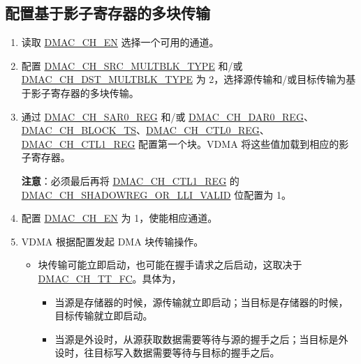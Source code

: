 \documentclass[main\_\_CN.tex]{subfiles}
\begin{document}
\subsection{配置基于影子寄存器的多块传输}
\begin{enumerate}
    \item 读取 \hyperref[fielddesc:DMACCH1EN]{DMAC\_CH\_EN} 选择一个可用的通道。

    \item 配置 \hyperref[fielddesc:DMACCHNSRCMULTBLKTYPE]{DMAC\_CH\_SRC\_MULTBLK\_TYPE} 和/或 \hyperref[fielddesc:DMACCHNDSTMULTBLKTYPE]{DMAC\_CH\_DST\_MULTBLK\_TYPE} 为 2，选择源传输和/或目标传输为基于影子寄存器的多块传输。

    \item 通过 \hyperref[regdesc:DMACCHNSAR0REG]{DMAC\_CH\_SAR0\_REG} 和/或 \hyperref[regdesc:DMACCHNDAR0REG]{DMAC\_CH\_DAR0\_REG}、\hyperref[fielddesc:DMACCHNBLOCKTS]{DMAC\_CH\_BLOCK\_TS}、\hyperref[regdesc:DMACCHNCTL0REG]{DMAC\_CH\_CTL0\_REG}、\hyperref[regdesc:DMACCHNCTL1REG]{DMAC\_CH\_CTL1\_REG} 配置第一个块。VDMA 将这些值加载到相应的影子寄存器。

    \textbf{注意}：必须最后再将 \hyperref[regdesc:DMACCHNCTL1REG]{DMAC\_CH\_CTL1\_REG} 的 \hyperref[fielddesc:DMACCHNSHADOWREGORLLIVALID]{DMAC\_CH\_SHADOWREG\_OR\_LLI\_VALID} 位配置为 1。


    \item 配置 \hyperref[fielddesc:DMACCH1EN]{DMAC\_CH\_EN} 为 1，使能相应通道。

    \item VDMA 根据配置发起 DMA 块传输操作。

        \begin{itemize}
        \item 块传输可能立即启动，也可能在握手请求之后启动，这取决于 \hyperref[fielddesc:DMACCHNTTFC]{DMAC\_CH\_TT\_FC}。具体为，
        \begin{itemize}
            \item 当源是存储器的时候，源传输就立即启动；当目标是存储器的时候，目标传输就立即启动。
            \item 当源是外设时，从源获取数据需要等待与源的握手之后；当目标是外设时，往目标写入数据需要等待与目标的握手之后。
        \end{itemize}


\end{itemize}
\end{enumerate}
\end{document}
